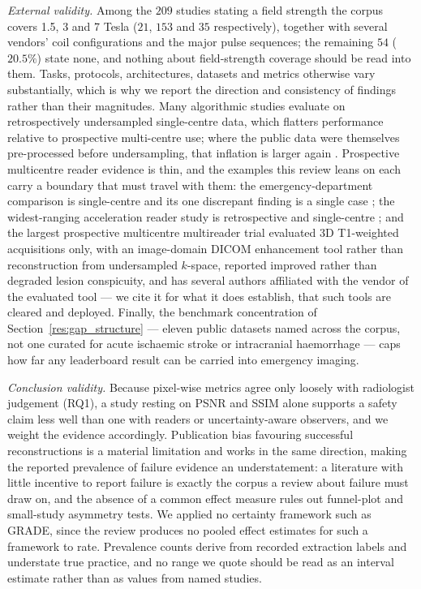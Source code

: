 \documentclass[review,authoryear]{elsarticle}
\begin{document}
\emph{External validity.} Among the $209$ studies stating a field strength the corpus
covers 1.5, 3 and 7 Tesla ($21$, $153$ and $35$ respectively), together with several
vendors' coil configurations and the major pulse sequences; the remaining $54$ ($20.5\%$)
state none, and nothing about field-strength coverage should be read into them. Tasks,
protocols, architectures, datasets and metrics otherwise vary substantially, which is why
we report the direction and consistency of findings rather than their magnitudes. Many
algorithmic studies evaluate on retrospectively undersampled single-centre data, which
flatters performance relative to prospective multi-centre use; where the public data were
themselves pre-processed before undersampling, that inflation is larger again
\citep{shimron2022implicit}. Prospective multicentre reader evidence is thin, and the
examples this review leans on each carry a boundary that must travel with them: the
emergency-department comparison is single-centre and its one discrepant finding is a single
case \citep{lang2024ultrafast}; the widest-ranging acceleration reader study is
retrospective and single-centre \citep{radmanesh2022exploring}; and the largest prospective
multicentre multireader trial evaluated 3D T1-weighted acquisitions only, with an
image-domain DICOM enhancement tool rather than reconstruction from undersampled
$k$-space, reported improved rather than degraded lesion conspicuity, and has several
authors affiliated with the vendor of the evaluated tool \citep{bash2021deep} --- we cite
it for what it does establish, that such tools are cleared and deployed. Finally, the
benchmark concentration of Section~\ref{res:gap_structure} --- eleven public datasets named
across the corpus, not one curated for acute ischaemic stroke or intracranial haemorrhage
--- caps how far any leaderboard result can be carried into emergency imaging.

\emph{Conclusion validity.} Because pixel-wise metrics agree only loosely with
radiologist judgement (RQ1), a study resting on PSNR and SSIM alone supports a safety
claim less well than one with readers or uncertainty-aware observers, and we weight
the evidence accordingly. Publication bias favouring successful reconstructions is a
material limitation and works in the same direction, making the reported prevalence of
failure evidence an understatement: a literature with little incentive to report
failure is exactly the corpus a review about failure must draw on, and the absence of
a common effect measure rules out funnel-plot and small-study asymmetry tests. We
applied no certainty framework such as GRADE, since the review produces no pooled
effect estimates for such a framework to rate. Prevalence counts derive from recorded
extraction labels and understate true practice, and no range we quote should be read
as an interval estimate rather than as values from named studies.
\end{document}
